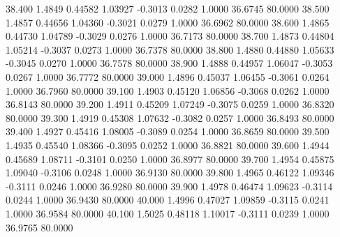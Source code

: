   38.400   1.4849   0.44582   1.03927  -0.3013   0.0282   1.0000  36.6745  80.0000
  38.500   1.4857   0.44656   1.04360  -0.3021   0.0279   1.0000  36.6962  80.0000
  38.600   1.4865   0.44730   1.04789  -0.3029   0.0276   1.0000  36.7173  80.0000
  38.700   1.4873   0.44804   1.05214  -0.3037   0.0273   1.0000  36.7378  80.0000
  38.800   1.4880   0.44880   1.05633  -0.3045   0.0270   1.0000  36.7578  80.0000
  38.900   1.4888   0.44957   1.06047  -0.3053   0.0267   1.0000  36.7772  80.0000
  39.000   1.4896   0.45037   1.06455  -0.3061   0.0264   1.0000  36.7960  80.0000
  39.100   1.4903   0.45120   1.06856  -0.3068   0.0262   1.0000  36.8143  80.0000
  39.200   1.4911   0.45209   1.07249  -0.3075   0.0259   1.0000  36.8320  80.0000
  39.300   1.4919   0.45308   1.07632  -0.3082   0.0257   1.0000  36.8493  80.0000
  39.400   1.4927   0.45416   1.08005  -0.3089   0.0254   1.0000  36.8659  80.0000
  39.500   1.4935   0.45540   1.08366  -0.3095   0.0252   1.0000  36.8821  80.0000
  39.600   1.4944   0.45689   1.08711  -0.3101   0.0250   1.0000  36.8977  80.0000
  39.700   1.4954   0.45875   1.09040  -0.3106   0.0248   1.0000  36.9130  80.0000
  39.800   1.4965   0.46122   1.09346  -0.3111   0.0246   1.0000  36.9280  80.0000
  39.900   1.4978   0.46474   1.09623  -0.3114   0.0244   1.0000  36.9430  80.0000
  40.000   1.4996   0.47027   1.09859  -0.3115   0.0241   1.0000  36.9584  80.0000
  40.100   1.5025   0.48118   1.10017  -0.3111   0.0239   1.0000  36.9765  80.0000
